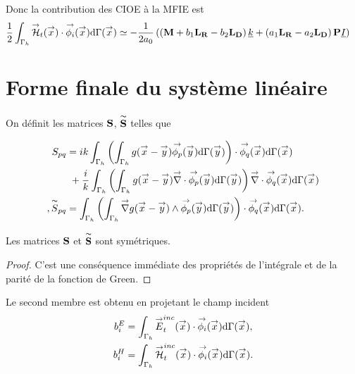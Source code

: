     Donc la contribution des CIOE à la MFIE est
    \begin{equation*}
      \begin{aligned}
        \frac{1}{2}\int_{\Gamma_h} \vH_t(\vx) \cdot \phii(\vx) \dd{\Gamma}(\vx)
        &\simeq -\frac{1}{2a_0} \left( \left(\mM + b_1 \mLR - b_2 \mLD\right) \comp{k}  + \left( a_1 \mLR - a_2 \mLD\right) \mPP \comp{I} \right)
      \end{aligned}
    \end{equation*}


\section{Forme finale du système linéaire}

  \begin{defn}
    On définit les matrices \(\mS\), \(\mSt\) telles que

    \begin{align*}
      S_{pq}
        &= ik \int_{\Gamma_h} \left( \int_{\Gamma_h} g(\vx - \vy) \phip(\vy) \dd{\Gamma}(\vy) \right) \cdot \phiq (\vx)\dd{\Gamma}(\vx)\\
        \notag&~+ \frac{i}{k}\int_{\Gamma_h} \left( \int_{\Gamma_h} g(\vx - \vy) \vdiv \phip (\vy) \dd{\Gamma}(\vy) \right) \vdiv \phiq(\vx) \dd{\Gamma}(\vx)\\,
      \tilde{S}_{pq}
        &= \int_{\Gamma_h} \left( \int_{\Gamma_h} \vgrad g(\vx - \vy) \pvect \phip(\vy) \dd{\Gamma}(\vy) \right) \cdot \phiq(\vx) \dd{\Gamma}(\vx).
    \end{align*}
  \end{defn}

  \begin{prop}
    Les matrices \(\mS\) et \(\mSt\) sont symétriques.
  \end{prop}
  \begin{proof}
    C'est une conséquence immédiate des propriétés de l'intégrale et de la parité de la fonction de Green.
  \end{proof}

  Le second membre est obtenu en projetant le champ incident
    \begin{align*}
      b_i^E &= \int_{\Gamma_h} \vE_t^{inc}(\vx) \cdot \phii(\vx)\dd{\Gamma}(\vx), \\
      b_i^H &= \int_{\Gamma_h} \vH_t^{inc}(\vx) \cdot \phii(\vx)\dd{\Gamma}(\vx).
    \end{align*}

